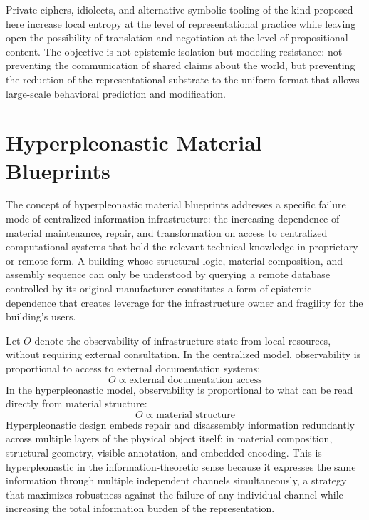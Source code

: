 \documentclass[12pt]{article}
\begin{document}
Private ciphers, idiolects, and alternative symbolic tooling of the kind proposed here increase local entropy at the level of representational practice while leaving open the possibility of translation and negotiation at the level of propositional content. The objective is not epistemic isolation but modeling resistance: not preventing the communication of shared claims about the world, but preventing the reduction of the representational substrate to the uniform format that allows large-scale behavioral prediction and modification.

\section{Hyperpleonastic Material Blueprints}

The concept of hyperpleonastic material blueprints addresses a specific failure mode of centralized information infrastructure: the increasing dependence of material maintenance, repair, and transformation on access to centralized computational systems that hold the relevant technical knowledge in proprietary or remote form. A building whose structural logic, material composition, and assembly sequence can only be understood by querying a remote database controlled by its original manufacturer constitutes a form of epistemic dependence that creates leverage for the infrastructure owner and fragility for the building's users.

Let $O$ denote the observability of infrastructure state from local resources, without requiring external consultation. In the centralized model, observability is proportional to access to external documentation systems:
\[
O \propto \text{external documentation access}
\]
In the hyperpleonastic model, observability is proportional to what can be read directly from material structure:
\[
O \propto \text{material structure}
\]
Hyperpleonastic design embeds repair and disassembly information redundantly across multiple layers of the physical object itself: in material composition, structural geometry, visible annotation, and embedded encoding. This is hyperpleonastic in the information-theoretic sense because it expresses the same information through multiple independent channels simultaneously, a strategy that maximizes robustness against the failure of any individual channel while increasing the total information burden of the representation.
\end{document}
